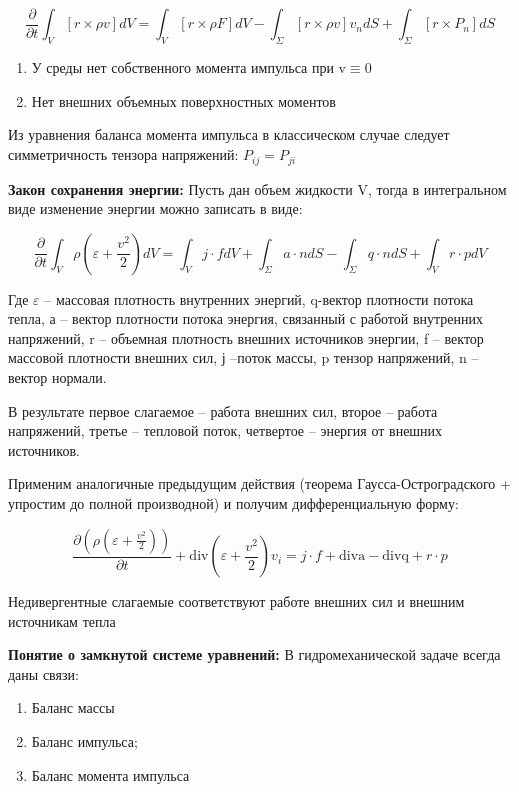 $$
\frac{\partial}{\partial t} \int_{V}[r \times \rho v] d V=\int_{V}[r \times \rho F] d V-\int_{\Sigma}[r \times \rho v] v_{n} d S+\int_{\Sigma}\left[r \times P_{n}\right] d S
$$

\begin{enumerate}
  \item У среды нет собственного момента импульса при $\mathrm{v} \equiv 0$

  \item Нет внешних объемных поверхностных моментов

\end{enumerate}

Из уравнения баланса момента импульса в классическом случае следует симметричность тензора напряжений: $P_{i j}=P_{j i}$

\textbf{Закон сохранения энергии:}
Пусть дан объем жидкости $\mathrm{V}$, тогда в интегральном виде изменение энергии можно записать в виде:

$$
\frac{\partial}{\partial t} \int_{V} \rho\left(\varepsilon+\frac{v^{2}}{2}\right) d V=\int_{V} j \cdot f d V+\int_{\Sigma} a \cdot n d S-\int_{\Sigma} q \cdot n d S+\int_{V} r \cdot p d V
$$

Где $\varepsilon$ -- массовая плотность внутренних энергий, q-вектор плотности потока тепла, а -- вектор плотности потока энергия, связанный с работой внутренних напряжений, r -- объемная плотность внешних источников энергии, f -- вектор массовой плотности внешних сил, ј --поток массы, p тензор напряжений, $\mathrm{n}$ -- вектор нормали. 


В результате первое слагаемое -- работа внешних сил, второе -- работа напряжений, третье -- тепловой поток, четвертое -- энергия от внешних источников.

Применим аналогичные предыдущим действия (теорема Гаусса-Остроградского + упростим до полной производной) и получим дифференциальную форму:

$$
\frac{\partial\left(\rho\left(\varepsilon+\frac{v^{2}}{2}\right)\right)}{\partial t}+\mathrm{div}\left(\varepsilon+\frac{v^{2}}{2}\right) v_{i}=j \cdot f+\mathrm{diva}-\mathrm{divq}+r \cdot p
$$

Недивергентные слагаемые соответствуют работе внешних сил и внешним источникам тепла

\textbf{Понятие о замкнутой системе уравнений:} В гидромеханической задаче всегда даны связи:

\begin{enumerate}
  \item Баланс массы
  \item Баланс импульса;
  \item Баланс момента импульса
\end{enumerate}

